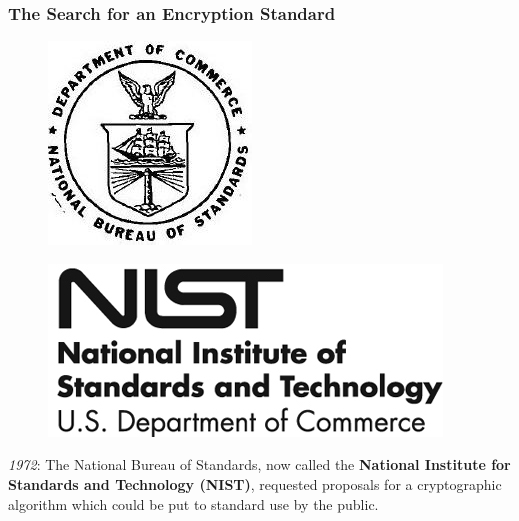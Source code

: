 \documentclass{beamer}
\newcommand{\<}{\langle}
\renewcommand{\>}{\rangle}
\begin{document}
\begin{frame}
\frametitle{The Search for an Encryption Standard}

\begin{figure}
\centering
\begin{minipage}{.5\textwidth}
  \centering
  \includegraphics[width=.6\linewidth]{IMG/nbs}
  \label{fig:test1}
\end{minipage}%
\begin{minipage}{.5\textwidth}
  \centering
  \includegraphics[width=.7\linewidth]{IMG/nist}
  \label{fig:test2}
\end{minipage}
\end{figure}

\emph{1972}: The National Bureau of Standards, now called the \textbf{National Institute for Standards and Technology (NIST)}, requested proposals for a cryptographic algorithm which could be put to standard use by the public. 
\end{frame}
\end{document}
